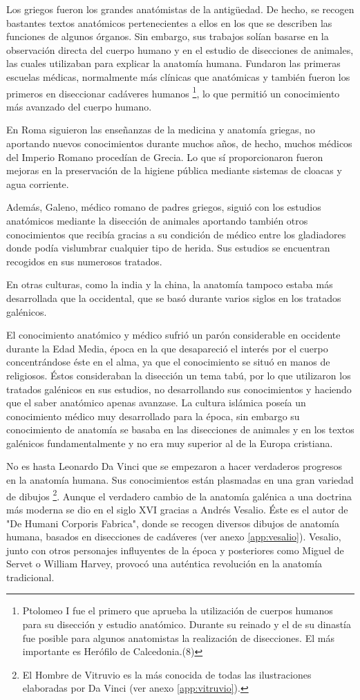 Los griegos fueron los grandes anatómistas de la antigüedad. De hecho, se recogen bastantes textos anatómicos pertenecientes a ellos en los que se describen las funciones de algunos órganos. Sin embargo, sus trabajos solían basarse en la observación directa del cuerpo humano y en el estudio de disecciones de animales, las cuales utilizaban para explicar la anatomía humana. Fundaron las primeras escuelas médicas, normalmente más clínicas que anatómicas y también fueron los primeros en diseccionar cadáveres humanos \footnote{Ptolomeo I fue el primero que aprueba la utilización de cuerpos humanos para su disección y estudio anatómico. Durante su reinado y el de su dinastía fue posible para algunos anatomistas la realización de disecciones. El más importante es Herófilo de Calcedonia.(8)}, lo que permitió un conocimiento más avanzado del cuerpo humano.

En Roma siguieron las enseñanzas de la medicina y anatomía griegas, no aportando nuevos conocimientos durante muchos años, de hecho, muchos médicos del Imperio Romano procedían de Grecia. Lo que sí proporcionaron fueron mejoras en la preservación de la higiene pública mediante sistemas de cloacas y agua corriente.

Además, Galeno, médico romano de padres griegos, siguió con los estudios anatómicos mediante la disección de animales aportando también otros conocimientos que recibía gracias a su condición de médico entre los gladiadores donde podía vislumbrar cualquier tipo de herida. Sus estudios se encuentran recogidos en sus numerosos tratados.

En otras culturas, como la india y la china, la anatomía tampoco estaba más desarrollada que la occidental, que se basó durante varios siglos en los tratados galénicos.

El conocimiento anatómico y médico sufrió un parón considerable en occidente durante la Edad Media, época en la que desapareció el interés por el cuerpo concentrándose éste en el alma, ya que el conocimiento se situó en manos de religiosos. Éstos consideraban la disección un tema tabú, por lo que utilizaron los tratados galénicos en sus estudios, no desarrollando sus conocimientos y haciendo que el saber anatómico apenas avanzase. La cultura islámica poseía un conocimiento médico muy desarrollado para la época, sin embargo su conocimiento de anatomía se basaba en las disecciones de animales y en los textos galénicos fundamentalmente y no era muy superior al de la Europa cristiana.

No es hasta Leonardo Da Vinci que se empezaron a hacer verdaderos progresos en la anatomía humana. Sus conocimientos están plasmadas en una gran variedad de dibujos \footnote{El Hombre de Vitruvio es la más conocida de todas las ilustraciones elaboradas por Da Vinci (ver anexo \autoref{app:vitruvio}).}. Aunque el verdadero cambio de la anatomía galénica a una doctrina más moderna se dio en el siglo XVI gracias a Andrés Vesalio. Éste es el autor de "De Humani Corporis Fabrica", donde se recogen diversos dibujos de anatomía humana, basados en disecciones de cadáveres (ver anexo \autoref{app:vesalio}). Vesalio, junto con otros personajes influyentes de la época y posteriores como Miguel de Servet o William Harvey, provocó una auténtica revolución en la anatomía tradicional.

